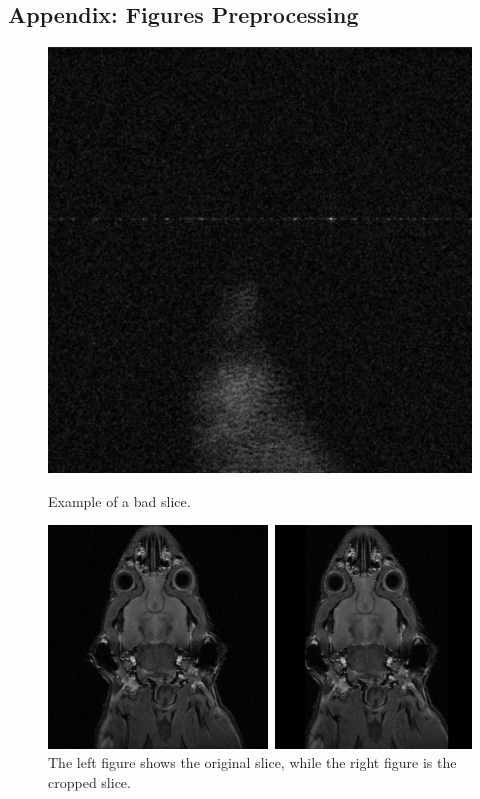 \documentclass[twocolumn]{article}
\begin{document}
\begin{appendices}
\newpage
\section{Appendix: Figures Preprocessing}
\label{Appendix: Figures Preprocessing}

\begin{figure}[h]
    \centering
    \begin{minipage}{0.3\textwidth}
        \centering
        \includegraphics[width=\linewidth]{bad_slice.png}
        \caption{Example of a bad slice.}
        \label{fig:bad_slice}
    \end{minipage}%
    \hfill
    \begin{minipage}{0.45\textwidth}
        \centering
        \includegraphics[width=\linewidth]{comparision cropped vs non cropped.png}
        \caption{The left figure shows the original slice, while the right figure is the cropped slice.}
        \label{fig:comparision-cropped}
    \end{minipage}
\end{figure}




\end{appendices}
\end{document}
